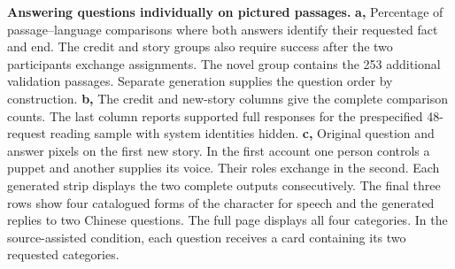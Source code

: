 \textbf{Answering questions individually on pictured passages.}
\textbf{a,} Percentage of passage--language comparisons where both answers identify their requested fact and end. The credit and story groups also require success after the two participants exchange assignments. The novel group contains the 253 additional validation passages. Separate generation supplies the question order by construction.
\textbf{b,} The credit and new-story columns give the complete comparison counts. The last column reports supported full responses for the prespecified 48-request reading sample with system identities hidden.
\textbf{c,} Original question and answer pixels on the first new story. In the first account one person controls a puppet and another supplies its voice. Their roles exchange in the second. Each generated strip displays the two complete outputs consecutively. The final three rows show four catalogued forms of the character for speech and the generated replies to two Chinese questions. The full page displays all four categories. In the source-assisted condition, each question receives a card containing its two requested categories.
